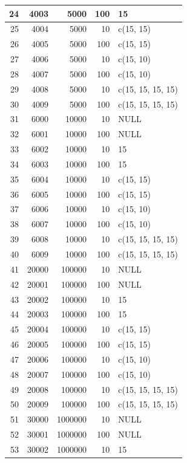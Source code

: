 \documentclass[11pt]{report}
\begin{document}
\begin{longtable}{|r|r|r|r|l|}
\hline
24 & 4003 & 5000 & 100 & 15 \\ 
\hline
25 & 4004 & 5000 & 10 & c(15, 15) \\ 
\hline
26 & 4005 & 5000 & 100 & c(15, 15) \\ 
\hline
27 & 4006 & 5000 & 10 & c(15, 10) \\ 
\hline
28 & 4007 & 5000 & 100 & c(15, 10) \\ 
\hline
29 & 4008 & 5000 & 10 & c(15, 15, 15, 15) \\
\hline
30 & 4009 & 5000 & 100 & c(15, 15, 15, 15) \\ 
\hline
\hline
31 & 6000 & 10000 & 10 & NULL \\ 
\hline
32 & 6001 & 10000 & 100 & NULL \\ 
\hline
33 & 6002 & 10000 & 10 & 15 \\ 
\hline
34 & 6003 & 10000 & 100 & 15 \\ 
\hline
35 & 6004 & 10000 & 10 & c(15, 15) \\ 
\hline
36 & 6005 & 10000 & 100 & c(15, 15) \\ 
\hline
37 & 6006 & 10000 & 10 & c(15, 10) \\ 
\hline
38 & 6007 & 10000 & 100 & c(15, 10) \\ 
\hline
39 & 6008 & 10000 & 10 & c(15, 15, 15, 15) \\ 
\hline
40 & 6009 & 10000 & 100 & c(15, 15, 15, 15) \\ 
\hline
\hline
41 & 20000 & 100000 & 10 & NULL \\ 
\hline
42 & 20001 & 100000 & 100 & NULL \\ 
\hline
43 & 20002 & 100000 & 10 & 15 \\
\hline
44 & 20003 & 100000 & 100 & 15 \\ 
\hline
45 & 20004 & 100000 & 10 & c(15, 15) \\ 
\hline
46 & 20005 & 100000 & 100 & c(15, 15) \\ 
\hline
47 & 20006 & 100000 & 10 & c(15, 10) \\ 
\hline
48 & 20007 & 100000 & 100 & c(15, 10) \\ 
\hline
49 & 20008 & 100000 & 10 & c(15, 15, 15, 15) \\ 
\hline
50 & 20009 & 100000 & 100 & c(15, 15, 15, 15) \\ 
\hline
\hline
51 & 30000 & 1000000 & 10 & NULL \\ 
\hline
52 & 30001 & 1000000 & 100 & NULL \\ 
\hline
53 & 30002 & 1000000 & 10 & 15 \\ 

\end{longtable}
\end{document}
